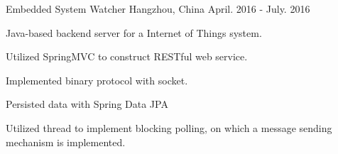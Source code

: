\cventry
{Embedded System} %
{Watcher} %
{Hangzhou, China} %
{April. 2016 - July. 2016} %
{ %
\begin{cvitems}
    \item {Java-based backend server for a Internet of Things system.}
    \item {Utilized SpringMVC to construct RESTful web service.}
    \item {Implemented binary protocol with socket.}
    \item {Persisted data with Spring Data JPA}
    \item {Utilized thread to implement blocking polling, on which a message sending mechanism is implemented.}
\end{cvitems}
}